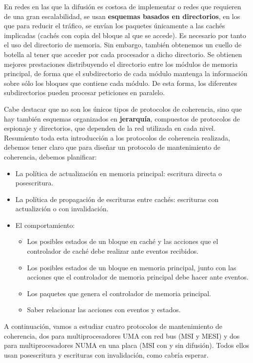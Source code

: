 En redes en las que la difusión es costosa de implementar o redes que requieren de una gran escalabilidad, se usan \textbf{esquemas basados en directorios}, en los que para reducir el tráfico, se envían los paquetes únicamente a las cachés implicadas (cachés con copia del bloque al que se accede). Es necesario por tanto el uso del directorio de memoria. Sin embargo, también obtenemos un cuello de botella al tener que acceder por cada procesador a dicho directorio. Se obtienen mejores prestaciones distribuyendo el directorio entre los módulos de memoria principal, de forma que el subdirectorio de cada módulo mantenga la información sobre sólo los bloques que contiene cada módulo. De esta forma, los diferentes subdirectorios pueden procesar peticiones en paralelo.

Cabe destacar que no son los únicos tipos de protocolos de coherencia, sino que hay también esquemas organizados en \textbf{jerarquía}, compuestos de protocolos de espionaje y directorios, que dependen de la red utilizada en cada nivel.\\

Resumiento toda esta introducción a los protocolos de coherencia realizada, debemos tener claro que para diseñar un protocolo de mantenimiento de coherencia, debemos planificar:
\begin{itemize}
    \item La política de actualización en memoria principal: escritura directa o posescritura.
    \item La política de propagación de escrituras entre cachés: escrituras con actualizción o con invalidación.
    \item El comportamiento:
        \begin{itemize}
            \item Los posibles estados de un bloque en caché y las acciones que el controlador de caché debe realizar ante eventos recibidos.
            \item Los posibles estados de un bloque en memoria principal, junto con las acciones que el controlador de memoria principal debe hacer ante eventos.
            \item Los paquetes que genera el controlador de memoria principal.
            \item Saber relacionar las acciones con eventos y estados.
        \end{itemize}
\end{itemize}
A continuación, vamos a estudiar cuatro protocolos de mantenimiento de coherencia, dos para multiprocesadores UMA con red bus (MSI y MESI) y dos para multiprocesadores NUMA en una placa (MSI con y sin difusión). Todos ellos usan posescritura y escrituras con invalidación, como cabría esperar.\\

